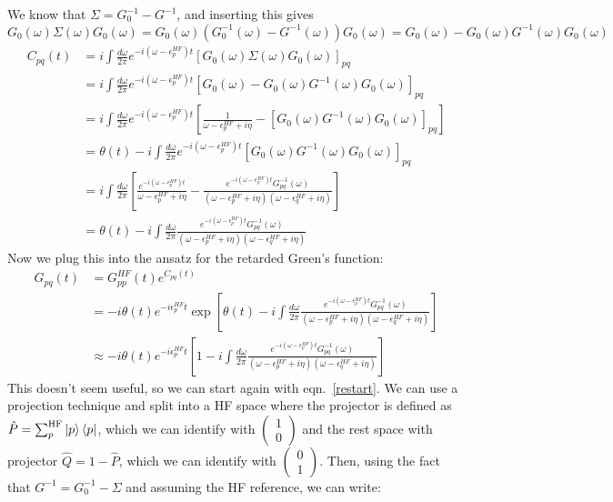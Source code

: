 We know that $\Sigma = G_0^{-1} - G^{-1}$, and inserting this gives\\ $G_0(\omega) \Sigma(\omega) G_0(\omega) = G_0(\omega) \left(G_0^{-1}(\omega) - G^{-1}(\omega)\right) G_0(\omega) = G_0(\omega) - G_0(\omega) G^{-1}(\omega) G_0(\omega)$
\begin{align}
	C_{pq}(t) &= i \int \frac{d\omega}{2\pi} e^{-i(\omega-\epsilon_p^{HF})t} \left[G_0(\omega) \Sigma(\omega) G_0(\omega)\right]_{pq} \\
&= i \int \frac{d\omega}{2\pi} e^{-i(\omega-\epsilon_p^{HF})t} \left[G_0(\omega) - G_0(\omega) G^{-
1}(\omega) G_0(\omega)\right]_{pq} \\
&= i \int \frac{d\omega}{2\pi} e^{-i(\omega-\epsilon_p^{HF})t} \left[\frac{1}{\omega - \epsilon_p^{HF} + i\eta} - \left[G_0(\omega) G^{-1}(\omega) G_0(\omega)\right]_{pq}\right] \\
&= \theta(t) - i \int \frac{d\omega}{2\pi} e^{-i(\omega-\epsilon_p^{HF})t}  \left[G_0(\omega) G^{-1}(\omega) G_0(\omega)\right]_{pq}
\label{restart} \\
&= i \int \frac{d\omega}{2\pi}  \left[\frac{e^{-i(\omega-\epsilon_p^{HF})t}}{\omega - \epsilon_p^{HF} + i\eta} - \frac{e^{-i(\omega-\epsilon_p^{HF})t}G^{-1}_{pq}(\omega)}{(\omega - \epsilon_p^{HF} + i\eta)(\omega - \epsilon_q^{HF} + i\eta)}\right] \\
&= \theta  (t) - i \int \frac{d\omega}{2\pi}  \frac{e^{-i(\omega-\epsilon_p^{HF})t}G^{-1}_{pq}(\omega)}{(\omega - \epsilon_p^{HF} + i\eta)(\omega - \epsilon_q^{HF} + i\eta)} 
\end{align}
Now we plug this into the ansatz for the retarded Green's function:
\begin{align}
    G_{pq}(t) &= G_{pp}^{HF}(t) e^{C_{pq}(t)} \\
&= -i \theta(t) e^{- i \epsilon_p^{HF} t} \exp \left[\theta(t) - i \int \frac{d\omega}{2\pi}  \frac{e^{-i(\omega-\epsilon_p^{HF})t}G^{-1}_{pq}(\omega)}{(\omega - \epsilon_p^{HF} + i\eta)(\omega - \epsilon_q^{HF} + i\eta)}\right] \\
&\approx -i \theta(t) e^{- i \epsilon_p^{HF} t} \left[1 - i \int \frac{d\omega}{2\pi}  \frac{e^{-i(\omega-\epsilon_p^{HF})t}G^{-1}_{pq}(\omega)}{(\omega - \epsilon_p^{HF} + i\eta)(\omega - \epsilon_q^{HF} + i\eta)}\right] 
\end{align}
This doesn't seem useful, so we can start again with eqn.~\ref{restart}.
We can use a projection technique and split into a HF space where the projector is defined as $\hat{P}=\sum_p^{\text{HF}}\ket{p}\bra{p}$, which we can identify with $\begin{pmatrix}1 \\ 0\end{pmatrix}$ and the rest space with projector $\hat{Q}=1-\hat{P}$, which we can identify with $\begin{pmatrix}0 \\ 1\end{pmatrix}$. Then, using the fact that $G^{-1} = G_0^{-1} - \Sigma$ and assuming the HF reference, we can write:
